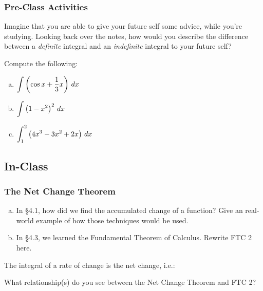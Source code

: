 \documentclass[notes]{subfiles}
\begin{document}
	\subsubsection*{Pre-Class Activities}
		\begin{ex}
			Imagine that you are able to give your future self some advice, while you're studying.  Looking back over the notes, how would you describe the difference between a \emph{definite} integral and an \emph{indefinite} integral to your future self?
		\end{ex}
			
		\begin{ex}
			Compute the following:
			\begin{enumerate}[(a)]
				\item  $\displaystyle \int \left( \cos x + \dfrac{1}{3}x\right)\, dx$
				\item $\displaystyle \int \left( 1-x^2\right)^2\, dx$
				\item $\displaystyle \int_1^2 \left( 4x^3 - 3x^2 + 2x\right)\, dx$
			\end{enumerate}
		\end{ex}
			\newpage
	
	\subsection*{In-Class}
	\subsubsection*{The Net Change Theorem}
		\begin{question}
			\begin{enumerate}[(a)]
				\item In \S4.1, how did we find the accumulated change of a function?  Give an real-world example of how those techniques would be used.
					
				\item In \S4.3, we learned the Fundamental Theorem of Calculus.  Rewrite FTC 2 here.
			\end{enumerate}
		\end{question}
		
		\begin{thm}
			The integral of a rate of change is the net change, i.e.:
			\showto{ins}{
				\[\int_a^b F'(x)\, dx = F(b) - F(a)\]
			}
			\showto{st}{
				\\ \\ \\ 
			}
		\end{thm}
		\begin{question}
			What relationship(s) do you see between the Net Change Theorem and FTC 2?
		\end{question}
			
\end{document}
